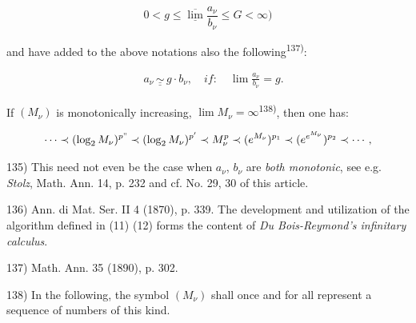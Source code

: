 \vspace{-0.3cm}
$$0 < g \le \underline{\overline{\lim}} \frac{a_\nu}{b_\nu} \le G < \infty)$$

and have added to the above notations also the following\textsuperscript{137)}:

\vspace{-0.5cm}
\begin{align}
    \quad a_\nu \, \underline{\underline{\sim}} \, g \cdot b_\nu, \quad if: \quad \lim \frac{a_\nu}{b_\nu} = g. 
\end{align}

If $(M_\nu)$ is monotonically increasing, $\lim M_\nu = \infty$\textsuperscript{138)}, then one has:

\vspace{-0.5cm}
\begin{align}
    \cdots \prec (\log_2 M_\nu)^{p"} \prec (\log_2 M_\nu)^{p'} \prec M_\nu^p  \prec (e^{M_\nu})^{p_1} \prec (e^{e^{M_\nu}})^{p_2} \prec \cdots,
\end{align}


\vfill
\leftline{\rule{2in}{0.4pt}}
\vspace{0.2cm}
{
\footnotesize
135) This need not even be the case when $a_\nu$, $b_\nu$ are \textit{both monotonic}, see e.g. \textit{Stolz}, Math. Ann. 14, p. 232 and cf. No. 29, 30 of this article.

136) Ann. di Mat. Ser. II 4 (1870), p. 339. The development and utilization of the algorithm defined in (11) (12) forms the content of \textit{Du Bois-Reymond's infinitary calculus}.

137) Math. Ann. 35 (1890), p. 302.

138) In the following, the symbol $(M_\nu)$ shall once and for all represent a sequence of numbers of this kind.

}